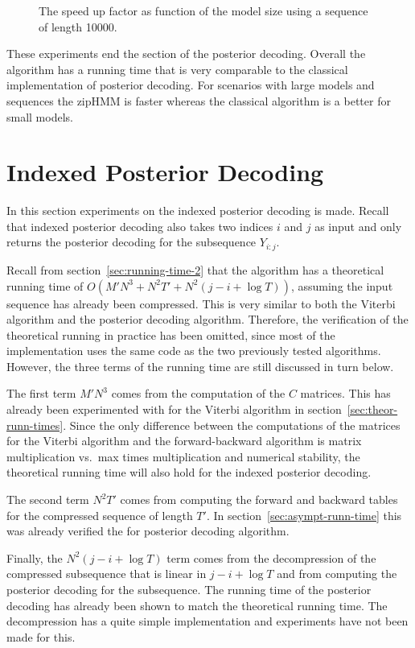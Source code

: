 \begin{figure}
  \centering
  
  \caption{The speed up factor as function of the model size using a sequence
    of length 10000.}
  \label{fig:posterior_speedup_vs_N}
\end{figure}

These experiments end the section of the posterior decoding. Overall the
algorithm has a running time that is very comparable to the classical
implementation of posterior decoding. For scenarios with large models and
sequences the zipHMM is faster whereas the classical algorithm is a better
for small models.

\section{Indexed Posterior Decoding}

In this section experiments on the indexed posterior decoding is
made. Recall that indexed posterior decoding also takes two indices $i$ and
$j$ as input and only returns the posterior decoding for the subsequence
$Y_{i:j}$.

Recall from section~\ref{sec:running-time-2} that the algorithm has a
theoretical running time of $O(M' N^3 + N^2 T' + N^2 (j - i + \log T))$,
assuming the input sequence has already been compressed. This is very similar
to both the Viterbi algorithm and the posterior decoding algorithm. Therefore,
the verification of the theoretical running in practice has been omitted, since
most of the implementation uses the same code as the two previously tested
algorithms. However, the three terms of the running time are still discussed in
turn below.

The first term $M' N^3$ comes from the computation of the $C$ matrices. This
has already been experimented with for the Viterbi algorithm in
section~\ref{sec:theor-runn-times}. Since the only difference between the
computations of the matrices for the Viterbi algorithm and the forward-backward
algorithm is matrix multiplication vs.\ max times multiplication and numerical
stability, the theoretical running time will also hold for the indexed posterior
decoding.

The second term $N^2 T'$ comes from computing the forward and backward tables
for the compressed sequence of length $T'$. In
section~\ref{sec:asympt-runn-time} this was already verified the for posterior
decoding algorithm.

Finally, the $N^2 (j - i + \log T)$ term comes from the decompression of the
compressed subsequence that is linear in $j - i + \log T$ and from computing
the posterior decoding for the subsequence. The running time of the posterior
decoding has already been shown to match the theoretical running time. The
decompression has a quite simple implementation and experiments have not been
made for this. 

